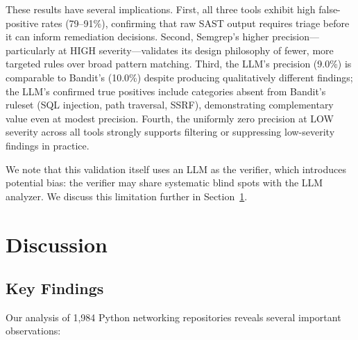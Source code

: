 \documentclass[sigconf,authordraft]{acmart}
\begin{document}
These results have several implications. First, all three tools
exhibit high false-positive rates (79--91\%), confirming that raw SAST
output requires triage before it can inform remediation decisions.
Second, Semgrep's higher precision---particularly at HIGH
severity---validates its design philosophy of fewer, more targeted
rules over broad pattern matching. Third, the LLM's precision (9.0\%)
is comparable to Bandit's (10.0\%) despite producing qualitatively
different findings; the LLM's confirmed true positives include
categories absent from Bandit's ruleset (SQL injection, path
traversal, SSRF), demonstrating complementary value even at modest
precision. Fourth, the uniformly zero precision at LOW severity across
all tools strongly supports filtering or suppressing low-severity
findings in practice.

We note that this validation itself uses an LLM as the verifier, which
introduces potential bias: the verifier may share systematic blind
spots with the LLM analyzer. We discuss this limitation further in
Section~\ref{sec:discussion}.


\section{Discussion}
\label{sec:discussion}

\subsection{Key Findings}

Our analysis of 1{,}984 Python networking repositories reveals several
important observations:
\end{document}
